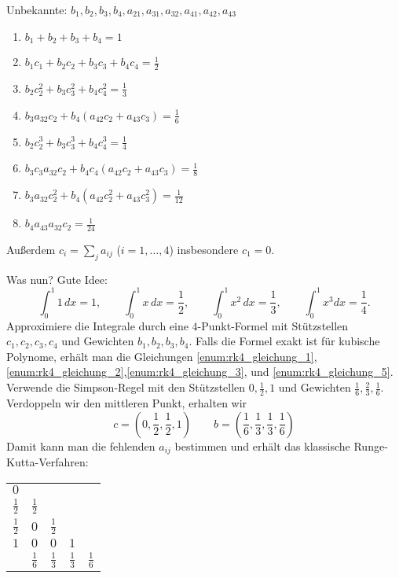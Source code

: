 Unbekannte: $b_1,b_2,b_3,b_4,a_{21},a_{31},a_{32},a_{41},a_{42},a_{43}$
\begin{enumerate}
 \item \label{enum:rk4_gleichung_1} $b_1+b_2+b_3+b_4=1$
 \item \label{enum:rk4_gleichung_2} $b_1c_1+b_2c_2+b_3c_3+b_4c_4=\frac{1}{2}$
 \item \label{enum:rk4_gleichung_3} $b_2c_2^2+b_3c_3^2+b_4c_4^2=\frac{1}{3}$
 \item $b_3a_{32}c_2+b_4 (a_{42}c_2+a_{43}c_3 )=\frac{1}{6}$
 \item \label{enum:rk4_gleichung_5} $b_2c_2^3+b_3c_3^3+b_4c_4^3=\frac{1}{4}$
 \item $b_3c_3a_{32}c_2+b_4c_4 (a_{42}c_2+a_{43}c_3 )=\frac{1}{8}$
 \item $b_3 a_{32} c_2^2 + b_4 (a_{42} c_2^2 + a_{43} c_3^2) = \frac{1}{12}$
 \item $b_4 a_{43} a_{32} c_2 = \frac{1}{24}$
\end{enumerate}
Außerdem $c_i = \sum_{j} a_{ij}$ ($i=1,\dots,4$) insbesondere $c_1 = 0$.

Was nun? Gute Idee:
\begin{equation*}
	\int_0^1 1\,dx=1,
	\qquad
	\int_0^1 x\,dx=\frac{1}{2},
	\qquad
	\int_0^1 x^2\,dx=\frac{1}{3},
	\qquad
	\int_0^1 x^3 dx=\frac{1}{4}.
\end{equation*}
Approximiere die Integrale durch eine $4$-Punkt-Formel mit Stützstellen $c_1,c_2,c_3,c_4$ und Gewichten $b_1,b_2,b_3,b_4$. Falls die Formel exakt ist für kubische Polynome, erhält man die Gleichungen \ref{enum:rk4_gleichung_1},
\ref{enum:rk4_gleichung_2},\ref{enum:rk4_gleichung_3}, und \ref{enum:rk4_gleichung_5}.
Verwende die Simpson-Regel mit den Stützstellen $0,\frac{1}{2},1$ und Gewichten $\frac{1}{6},\frac{2}{3},\frac{1}{6}$. Verdoppeln wir den mittleren Punkt, erhalten wir
\begin{equation*}
	 c=(0,\frac{1}{2},\frac{1}{2},1 )
	 \qquad
	 b=(\frac{1}{6},\frac{1}{3},\frac{1}{3},\frac{1}{6} )
\end{equation*}
Damit kann man die fehlenden $a_{ij}$ bestimmen und erhält das klassische Runge-Kutta-Verfahren:
\begin{center}
	\begin{tabular}{c|cccc}
		$0$           &               &               &               &  \\
		$\frac{1}{2}$ & $\frac{1}{2}$ &               &               &  \\
		$\frac{1}{2}$ & $0$           & $\frac{1}{2}$ &               &  \\
		$1$           & $0$           & $0$           & $1$           &  \\ \hline
		              & $\frac{1}{6}$ & $\frac{1}{3}$ & $\frac{1}{3}$ & $\frac{1}{6}$ \\
	\end{tabular}
\end{center}

